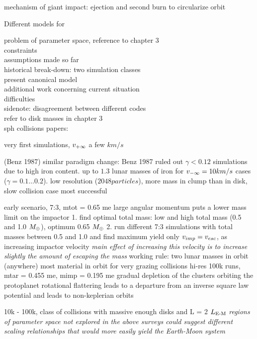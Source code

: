 mechanism of giant impact: ejection and second burn to circularize orbit


Different models for 

problem of parameter space, reference to chapter 3\\
constraints\\
assumptions made so far\\
historical break-down: two simulation classes\\
present canonical model\\
additional work concerning
current situation\\

difficulties\\

sidenote: disagreement between different codes\\


refer to disk masses in chapter 3\\

sph collisions papers:


\citep{Benz:1985p1755}
very first simulations, $v_{+\infty}$ a few $km/s$

\citep{Benz:1989p1893}
(Benz 1987) \citep{1987Icar...71...30B} similar paradigm change: Benz 1987  ruled out $\gamma < 0.12$ simulations due to high iron content. up to $1.3$ lunar masses of iron for $v_{-\infty} = 10km/s$ cases ($\gamma = 0.1 \dots 0.2$). low resolution ($2048 particles$), more mass in clump than in disk, slow collision case most successful


\citep{Cameron:2000p1854}
early scenario, 7:3, mtot = 0.65 me
large angular momentum puts a lower mass limit on the impactor
1. find optimal total mass: low and high total mass (0.5 and 1.0 $M_{\oplus}$), optimum 0.65 $M_{\oplus}$
2. run different 7:3 simulations with total masses between 0.5 and 1.0 and find maximum yield
only $v_{imp} = v_{esc}$, as increasing impactor velocity \emph{main effect of increasing this velocity is to increase slightly the amount of escaping the mass}
working rule: two lunar masses in orbit (anywhere)
most material in orbit for very grazing collisions
hi-res 100k runs, mtar = 0.455 me, mimp = 0.195 me
gradual depletion of the clusters orbiting the protoplanet
rotational flattering leads to a departure from an inverse square law potential and leads to non-keplerian orbits


\citep{Canup:2001p3295}
10k - 100k, class of collisions with massive enough disks and L = 2 $L_{\textrm{E-M}}$
\emph{regions of parameter space not explored in the above surveys could suggest different scaling relationships that would more easily yield the Earth-Moon system}

